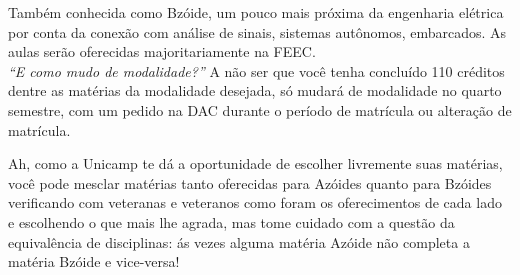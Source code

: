 Também conhecida como Bzóide, um pouco mais próxima da engenharia elétrica por
conta da conexão com análise de sinais, sistemas autônomos, embarcados. As
aulas serão oferecidas majoritariamente na FEEC.\\ %

{\emph{``E como mudo de modalidade?''}} A não ser que você tenha concluído 110
créditos dentre as matérias da modalidade desejada, só mudará de modalidade no
quarto semestre, com um pedido na DAC durante o período de matrícula ou
alteração de matrícula.

Ah, como a Unicamp te dá a oportunidade de escolher livremente suas matérias,
você pode mesclar matérias tanto oferecidas para Azóides quanto para Bzóides
verificando com veteranas e veteranos como foram os oferecimentos de cada lado
e escolhendo o que mais lhe agrada, mas tome cuidado com a questão da
equivalência de disciplinas: ás vezes alguma matéria Azóide não completa a
matéria Bzóide e vice-versa!
